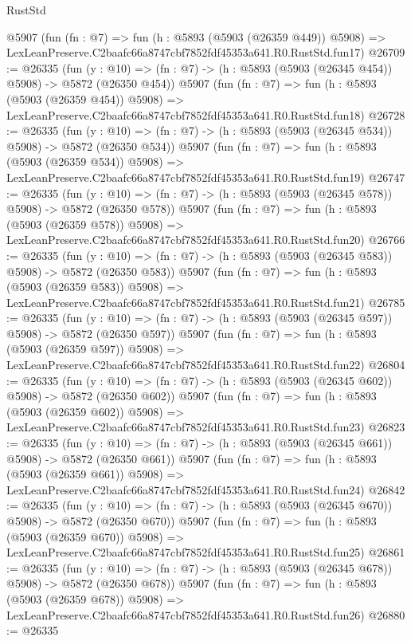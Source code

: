 \begin{lexlean}{RustStd}
\begin{coremodule}
    @5907
    (fun (fn : @7) =>
    fun (h : @5893 (@5903 (@26359 @449)) @5908) =>
    LexLeanPreserve.C2baafc66a8747cbf7852fdf45353a641.R0.RustStd.fun17)
@26709 := @26335
    (fun (y : @10) => (fn : @7) -> (h : @5893 (@5903 (@26345 @454)) @5908) -> @5872 (@26350 @454))
    @5907
    (fun (fn : @7) =>
    fun (h : @5893 (@5903 (@26359 @454)) @5908) =>
    LexLeanPreserve.C2baafc66a8747cbf7852fdf45353a641.R0.RustStd.fun18)
@26728 := @26335
    (fun (y : @10) => (fn : @7) -> (h : @5893 (@5903 (@26345 @534)) @5908) -> @5872 (@26350 @534))
    @5907
    (fun (fn : @7) =>
    fun (h : @5893 (@5903 (@26359 @534)) @5908) =>
    LexLeanPreserve.C2baafc66a8747cbf7852fdf45353a641.R0.RustStd.fun19)
@26747 := @26335
    (fun (y : @10) => (fn : @7) -> (h : @5893 (@5903 (@26345 @578)) @5908) -> @5872 (@26350 @578))
    @5907
    (fun (fn : @7) =>
    fun (h : @5893 (@5903 (@26359 @578)) @5908) =>
    LexLeanPreserve.C2baafc66a8747cbf7852fdf45353a641.R0.RustStd.fun20)
@26766 := @26335
    (fun (y : @10) => (fn : @7) -> (h : @5893 (@5903 (@26345 @583)) @5908) -> @5872 (@26350 @583))
    @5907
    (fun (fn : @7) =>
    fun (h : @5893 (@5903 (@26359 @583)) @5908) =>
    LexLeanPreserve.C2baafc66a8747cbf7852fdf45353a641.R0.RustStd.fun21)
@26785 := @26335
    (fun (y : @10) => (fn : @7) -> (h : @5893 (@5903 (@26345 @597)) @5908) -> @5872 (@26350 @597))
    @5907
    (fun (fn : @7) =>
    fun (h : @5893 (@5903 (@26359 @597)) @5908) =>
    LexLeanPreserve.C2baafc66a8747cbf7852fdf45353a641.R0.RustStd.fun22)
@26804 := @26335
    (fun (y : @10) => (fn : @7) -> (h : @5893 (@5903 (@26345 @602)) @5908) -> @5872 (@26350 @602))
    @5907
    (fun (fn : @7) =>
    fun (h : @5893 (@5903 (@26359 @602)) @5908) =>
    LexLeanPreserve.C2baafc66a8747cbf7852fdf45353a641.R0.RustStd.fun23)
@26823 := @26335
    (fun (y : @10) => (fn : @7) -> (h : @5893 (@5903 (@26345 @661)) @5908) -> @5872 (@26350 @661))
    @5907
    (fun (fn : @7) =>
    fun (h : @5893 (@5903 (@26359 @661)) @5908) =>
    LexLeanPreserve.C2baafc66a8747cbf7852fdf45353a641.R0.RustStd.fun24)
@26842 := @26335
    (fun (y : @10) => (fn : @7) -> (h : @5893 (@5903 (@26345 @670)) @5908) -> @5872 (@26350 @670))
    @5907
    (fun (fn : @7) =>
    fun (h : @5893 (@5903 (@26359 @670)) @5908) =>
    LexLeanPreserve.C2baafc66a8747cbf7852fdf45353a641.R0.RustStd.fun25)
@26861 := @26335
    (fun (y : @10) => (fn : @7) -> (h : @5893 (@5903 (@26345 @678)) @5908) -> @5872 (@26350 @678))
    @5907
    (fun (fn : @7) =>
    fun (h : @5893 (@5903 (@26359 @678)) @5908) =>
    LexLeanPreserve.C2baafc66a8747cbf7852fdf45353a641.R0.RustStd.fun26)
@26880 := @26335

\end{coremodule}
\end{lexlean}
